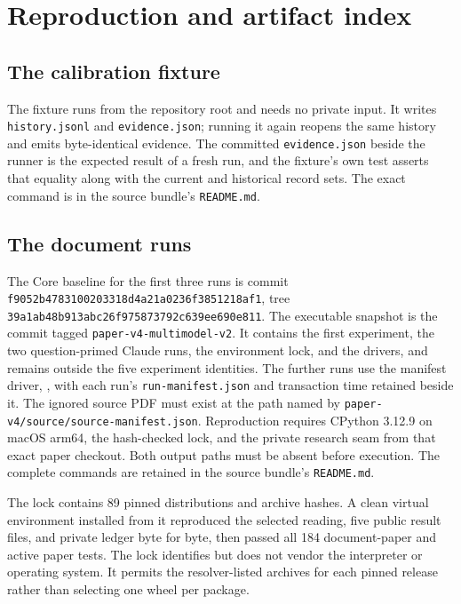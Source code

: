 \documentclass[10pt]{article}
\newcommand{\code}[1]{\texttt{#1}}
\newcommand{\gitid}[1]{{\scriptsize\nolinkurl{#1}}}
\begin{document}
\section{Reproduction and artifact index}
\label{app:repro}

\subsection{The calibration fixture}

The fixture runs from the repository root and needs no private input. It writes \code{history.jsonl} and \code{evidence.json}; running it again reopens the same history and emits byte-identical evidence. The committed \code{evidence.json} beside the runner is the expected result of a fresh run, and the fixture's own test asserts that equality along with the current and historical record sets. The exact command is in the source bundle's \code{README.md}.

\subsection{The document runs}

The Core baseline for the first three runs is commit \gitid{f9052b4783100203318d4a21a0236f3851218af1}, tree \gitid{39a1ab48b913abc26f975873792c639ee690e811}. The executable snapshot is the commit tagged \code{paper-v4-multimodel-v2}. It contains the first experiment, the two question-primed Claude runs, the environment lock, and the drivers, and remains outside the five experiment identities. The further runs use the manifest driver, {\scriptsize{}}, with each run's \code{run-manifest.json} and transaction time retained beside it. The ignored source PDF must exist at the path named by \code{paper-v4/source/source-manifest.json}. Reproduction requires CPython 3.12.9 on macOS arm64, the hash-checked lock, and the private research seam from that exact paper checkout. Both output paths must be absent before execution. The complete commands are retained in the source bundle's \code{README.md}.

The lock contains 89 pinned distributions and archive hashes. A clean virtual environment installed from it reproduced the selected reading, five public result files, and private ledger byte for byte, then passed all 184 document-paper and active paper tests. The lock identifies but does not vendor the interpreter or operating system. It permits the resolver-listed archives for each pinned release rather than selecting one wheel per package.
\end{document}
